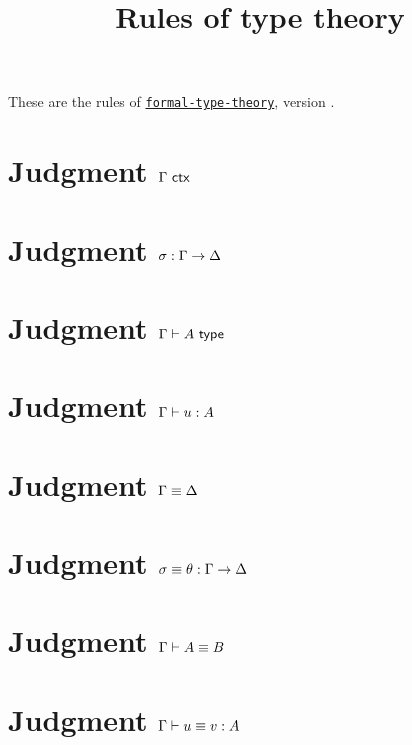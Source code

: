 \documentclass{article}
\begin{document}
\title{Rules of type theory}
\author{}
\maketitle

These are the rules of
\href{https://github.com/TheoWinterhalter/formal-type-theory}{\texttt{formal-type-theory}},
version \texttt{}.

\section*{Judgment $\Gamma\ \mathsf{ctx}$}

\isctxRules

\section*{Judgment $\sigma : \Gamma \to \Delta$}

\issubstRules

\section*{Judgment $\Gamma \vdash A \ \mathsf{type}$}

\istypeRules

\section*{Judgment $\Gamma \vdash u : A$}

\istermRules

\section*{Judgment $\Gamma \equiv \Delta$}

\eqctxRules

\section*{Judgment $\sigma \equiv \theta : \Gamma \to \Delta$}

\eqsubstRules

\section*{Judgment $\Gamma \vdash A \equiv B$}

\eqtypeRules

\section*{Judgment $\Gamma \vdash u \equiv v : A$}

\eqtermRules
\end{document}
